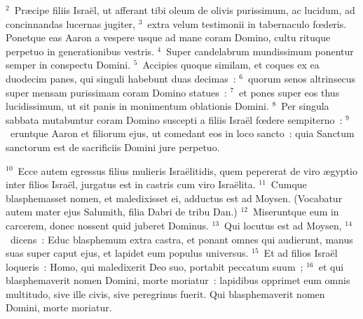 ${}^{2}$~Pr\ae cipe filiis Isra\"el, ut afferant tibi oleum de olivis purissimum, ac lucidum, ad concinnandas lucernas jugiter,
${}^{3}$~extra velum testimonii in tabernaculo fœderis. Ponetque eas Aaron a vespere usque ad mane coram Domino, cultu rituque perpetuo in generationibus vestris.
${}^{4}$~Super candelabrum mundissimum ponentur semper in conspectu Domini.
${}^{5}$~Accipies quoque similam, et coques ex ea duodecim panes, qui singuli habebunt duas decimas~:
${}^{6}$~quorum senos altrinsecus super mensam purissimam coram Domino statues~:
${}^{7}$~et pones super eos thus lucidissimum, ut sit panis in monimentum oblationis Domini.
${}^{8}$~Per singula sabbata mutabuntur coram Domino suscepti a filiis Isra\"el fœdere sempiterno~:
${}^{9}$~eruntque Aaron et filiorum ejus, ut comedant eos in loco sancto~: quia Sanctum sanctorum est de sacrificiis Domini jure perpetuo.


${}^{10}$~Ecce autem egressus filius mulieris Isra\"elitidis, quem pepererat de viro \ae gyptio inter filios Isra\"el, jurgatus est in castris cum viro Isra\"elita.
${}^{11}$~Cumque blasphemasset nomen, et maledixisset ei, adductus est ad Moysen. (Vocabatur autem mater ejus Salumith, filia Dabri de tribu Dan.)
${}^{12}$~Miseruntque eum in carcerem, donec nossent quid juberet Dominus.
${}^{13}$~Qui locutus est ad Moysen,
${}^{14}$~dicens~: Educ blasphemum extra castra, et ponant omnes qui audierunt, manus suas super caput ejus, et lapidet eum populus universus.
${}^{15}$~Et ad filios Isra\"el loqueris~: Homo, qui maledixerit Deo suo, portabit peccatum suum~;
${}^{16}$~et qui blasphemaverit nomen Domini, morte moriatur~: lapidibus opprimet eum omnis multitudo, sive ille civis, sive peregrinus fuerit. Qui blasphemaverit nomen Domini, morte moriatur.


